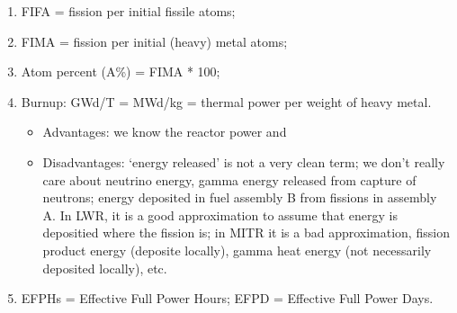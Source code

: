 \documentclass{school-22.211-notes}
\begin{document}
\clearpage
{}
\begin{enumerate}
\item FIFA = fission per initial fissile atoms;
\item FIMA = fission per initial (heavy) metal atoms;
\item Atom percent (A\%) = FIMA * 100;
\item Burnup: GWd/T = MWd/kg = thermal power per weight of heavy metal. 
  \begin{itemize}
    \item Advantages: we know the reactor power and 
    \item Disadvantages: `energy released' is not a very clean term; we don't really care about neutrino energy, gamma energy released from capture of neutrons; energy deposited in fuel assembly B from fissions in assembly A. In LWR, it is a good approximation to assume that energy is depositied where the fission is; in MITR it is a bad approximation, fission product energy (deposite locally), gamma heat energy (not necessarily deposited locally), etc. 
  \end{itemize}
\item EFPHs = Effective Full Power Hours; EFPD = Effective Full Power Days. 
\end{enumerate}
\end{document}
